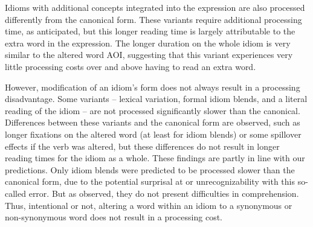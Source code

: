 \documentclass[output=paper
,modfonts
,nonflat]{langsci/langscibook}
\begin{document}
Idioms with additional concepts integrated into the expression are also processed differently from the canonical form. These variants require additional processing time, as anticipated, but this longer reading time is largely attributable to the extra word in the expression. The longer duration on the whole idiom is very similar to the altered word AOI, suggesting that this variant experiences very little processing costs over and above having to read an extra word.
 
However, modification of an idiom's form does not always result in a processing disadvantage. Some variants -- lexical variation, formal idiom blends, and a literal reading of the idiom -- are not processed significantly slower than the canonical. Differences between these variants and the canonical form are observed, such as longer fixations on the altered word (at least for idiom blends) or some spillover effects if the verb was altered, but these differences do not result in longer reading times for the idiom as a whole. These findings are partly in line with our predictions. Only idiom blends were predicted to be processed slower than the canonical form, due to the potential surprisal at or unrecognizability with this so-called error. But as observed, they do not present difficulties in comprehension. Thus, intentional or not, altering a word within an idiom to a synonymous or non-synonymous word does not result in a processing cost.
\end{document}
